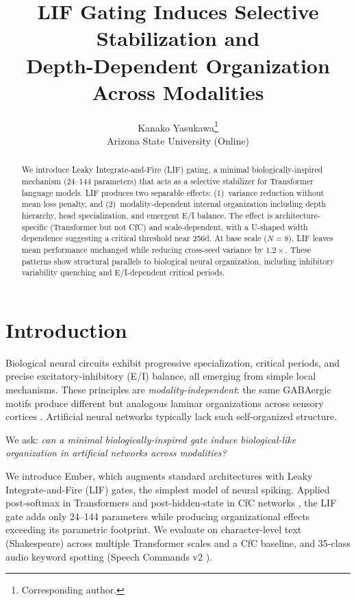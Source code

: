 \documentclass[11pt]{article}
\title{LIF Gating Induces Selective Stabilization and \\
Depth-Dependent Organization Across Modalities}
\author{
  Kanako Yasukawa\thanks{Corresponding author.} \\
  Arizona State University (Online)\\
}
\begin{document}
\maketitle

\begin{abstract}
We introduce Leaky Integrate-and-Fire (LIF) gating, a minimal biologically-inspired mechanism (24--144 parameters) that acts as a selective stabilizer for Transformer language models. LIF produces two separable effects: (1)~variance reduction without mean loss penalty, and (2)~modality-dependent internal organization including depth hierarchy, head specialization, and emergent E/I balance. The effect is architecture-specific (Transformer but not CfC) and scale-dependent, with a U-shaped width dependence suggesting a critical threshold near 256d. At base scale ($N{=}8$), LIF leaves mean performance unchanged while reducing cross-seed variance by $1.2\times$. These patterns show structural parallels to biological neural organization, including inhibitory variability quenching and E/I-dependent critical periods.
\end{abstract}

\section{Introduction}

Biological neural circuits exhibit progressive specialization, critical periods, and precise excitatory-inhibitory (E/I) balance, all emerging from simple local mechanisms. These principles are \emph{modality-independent}: the same GABAergic motifs produce different but analogous laminar organizations across sensory cortices \cite{douglas2004neuronal}. Artificial neural networks typically lack such self-organized structure.

We ask: \emph{can a minimal biologically-inspired gate induce biological-like organization in artificial networks across modalities?}

We introduce Ember, which augments standard architectures with Leaky Integrate-and-Fire (LIF) gates, the simplest model of neural spiking. Applied post-softmax in Transformers and post-hidden-state in CfC networks \cite{hasani2022closed}, the LIF gate adds only 24--144 parameters while producing organizational effects exceeding its parametric footprint. We evaluate on character-level text (Shakespeare) across multiple Transformer scales and a CfC baseline, and 35-class audio keyword spotting (Speech Commands v2 \cite{warden2018speech}).
\end{document}
